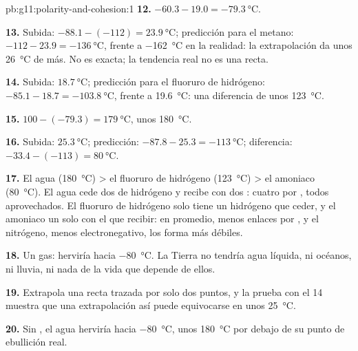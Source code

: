 \begin{solution}{pb:g11:polarity-and-cohesion:1}
\textbf{12.} $-60.3 - 19.0 = \qty{-79.3}{\celsius}$.

\textbf{13.} Subida: $-88.1 - (-112) = \qty{23.9}{\celsius}$; predicción
para el metano: $-112 - 23.9 = \qty{-136}{\celsius}$, frente a
\qty{-162}{\celsius} en la realidad: la extrapolación da unos
\qty{26}{\celsius} de más. No es exacta; la tendencia real no es una
recta.

\textbf{14.} Subida: $\qty{18.7}{\celsius}$; predicción para el fluoruro
de hidrógeno: $-85.1 - 18.7 = \qty{-103.8}{\celsius}$, frente a
\qty{19.6}{\celsius}: una diferencia de unos \qty{123}{\celsius}.

\textbf{15.} $100 - (-79.3) = \qty{179}{\celsius}$, unos
\qty{180}{\celsius}.

\textbf{16.} Subida: $\qty{25.3}{\celsius}$; predicción:
$-87.8 - 25.3 =
\qty{-113}{\celsius}$; diferencia:
$-33.4 - (-113) = \qty{80}{\celsius}$.

\textbf{17.} El agua (\qty{180}{\celsius}) > el fluoruro de hidrógeno
(\qty{123}{\celsius}) > el amoniaco (\qty{80}{\celsius}). El agua cede
dos  de hidrógeno y recibe con dos : cuatro
 por , todos aprovechados. El fluoruro de
hidrógeno solo tiene un hidrógeno que ceder, y el amoniaco un solo  con el que recibir: en promedio, menos enlaces por
, y el nitrógeno, menos electronegativo, los forma más débiles.

\textbf{18.} Un gas: herviría hacia \qty{-80}{\celsius}. La Tierra no
tendría agua líquida, ni océanos, ni lluvia, ni nada de la vida que
depende de ellos.

\textbf{19.} Extrapola una recta trazada por solo dos puntos, y la prueba
con el  14 muestra que una extrapolación así puede equivocarse en
unos \qty{25}{\celsius}.

\textbf{20.} Sin , el agua herviría hacia
\qty{-80}{\celsius}, unos \qty{180}{\celsius} por debajo de su punto de
ebullición real.
\end{solution}
